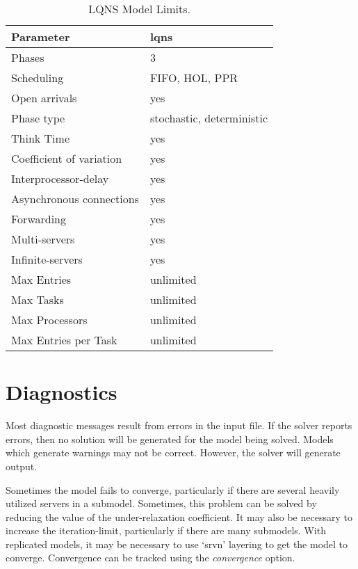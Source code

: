 \begin{table}[htbp]
  \centering
  \begin{tabular}[c]{ll}
    Parameter&lqns \\
    \hline
    Phases\index{ phase!maximum} & 3\\
    Scheduling\index{ scheduling} & FIFO, HOL, PPR\\
    Open arrivals\index{ open arrival} & yes\\
    Phase type\index{ phase!type} & stochastic, deterministic\\
    Think Time\index{ think time} & yes\\
    Coefficient of variation\index{ coefficient of variation} & yes\\
    Interprocessor-delay\index{ interprocessor delay} & yes\\
    Asynchronous connections\index{ asynchronous connections} & yes\\
    Forwarding\index{ forwarding} & yes\\
    Multi-servers\index{ multi-server} & yes\\
    Infinite-servers\index{ infinite server} & yes\\
    Max Entries\index{ entry!maximum} & unlimited\\
    Max Tasks\index{ task!maximum} & unlimited\\
    Max Processors\index{ processor!maximum} & unlimited\\
    Max Entries per Task & unlimited\\
    \hline
  \end{tabular}
  \caption{\label{tab:lqns-model-limits}LQNS Model Limits.}
\end{table}
\section{Diagnostics}
\label{sec:lqns-diagnostics}
Most diagnostic messages result from errors in the input file.
If the solver reports errors, then no solution will be generated for
the model being solved.  Models which generate warnings may not be
correct.  However, the solver will generate output.


Sometimes the model fails to converge, particularly if there are several
heavily utilized servers in a submodel.  Sometimes, this problem can
be solved by reducing the value of the under-relaxation coefficient.  It
may also be necessary to increase the iteration-limit, particularly if
there are many submodels.  With replicated models, it may be necessary
to use `srvn' layering to get the model to converge.  Convergence can be tracked
using the \emph{convergence} option.


